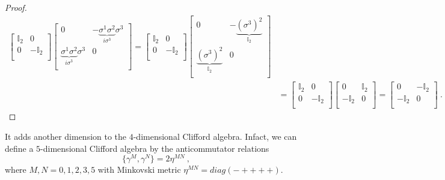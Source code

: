 \begin{proof}
\begin{equation*}
\begin{aligned}
\begin{bmatrix}
                \mathbb I_2 & 0 \\ 0 & - \mathbb I_2 \\
            \end{bmatrix} \begin{bmatrix}
                0 & - \underbrace{\sigma^1 \sigma^2}_{i \sigma^3} \sigma^3 \\ \underbrace{\sigma^1 \sigma^2}_{i \sigma^3} \sigma^3 & 0 \\
            \end{bmatrix} = \begin{bmatrix}
                \mathbb I_2 & 0 \\ 0 & - \mathbb I_2 \\
            \end{bmatrix} \begin{bmatrix}
                0 & - \underbrace{(\sigma^3)^2 }_{\mathbb I_2}\\ \underbrace{(\sigma^3)^2 }_{\mathbb I_2} & 0 \\
            \end{bmatrix} \\ & = \begin{bmatrix}
                \mathbb I_2 & 0 \\ 0 & - \mathbb I_2 \\
            \end{bmatrix} \begin{bmatrix}
                0 & \mathbb I_2 \\ - \mathbb I_2 & 0 \\
            \end{bmatrix} = \begin{bmatrix}
                0 & -\mathbb I_2 \\ - \mathbb I_2 & 0 \\
            \end{bmatrix} ~.
        \end{aligned}
        \end{equation*}
    \end{proof}

    It adds another dimension to the $4$-dimensional Clifford algebra. Infact, we can define a $5$-dimensional Clifford algebra by the anticommutator relations
    \begin{equation*}
        \{\gamma^M, \gamma^N\} = 2 \eta^{MN} ~,
    \end{equation*}
    where $M, N = 0,1,2,3,5$ with Minkovski metric $\eta^{MN} = diag(-++++)$.

